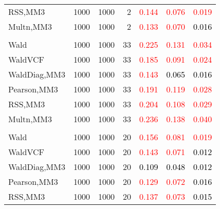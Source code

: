 \documentclass[
]{article}
\begin{document}
\begin{table}[H]
{\begin{tabular}[t]{lrrrrrr}
\hspace{1em}RSS,MM3 & 1000 & 1000 & 2 & \textcolor{red}{0.144} & \textcolor{red}{0.076} & \textcolor{red}{0.019}\\
\hspace{1em}Multn,MM3 & 1000 & 1000 & 2 & \textcolor{red}{0.133} & \textcolor{red}{0.070} & \textcolor{black}{0.016}\\
\addlinespace[0.3em]
\multicolumn{7}{l}{\textbf{1F 15V}}\\
\hspace{1em}Wald & 1000 & 1000 & 33 & \textcolor{red}{0.225} & \textcolor{red}{0.131} & \textcolor{red}{0.034}\\
\hspace{1em}WaldVCF & 1000 & 1000 & 33 & \textcolor{red}{0.185} & \textcolor{red}{0.091} & \textcolor{red}{0.024}\\
\hspace{1em}WaldDiag,MM3 & 1000 & 1000 & 33 & \textcolor{red}{0.143} & \textcolor{black}{0.065} & \textcolor{black}{0.016}\\
\hspace{1em}Pearson,MM3 & 1000 & 1000 & 33 & \textcolor{red}{0.191} & \textcolor{red}{0.119} & \textcolor{red}{0.028}\\
\hspace{1em}RSS,MM3 & 1000 & 1000 & 33 & \textcolor{red}{0.204} & \textcolor{red}{0.108} & \textcolor{red}{0.029}\\
\hspace{1em}Multn,MM3 & 1000 & 1000 & 33 & \textcolor{red}{0.236} & \textcolor{red}{0.138} & \textcolor{red}{0.040}\\
\addlinespace[0.3em]
\multicolumn{7}{l}{\textbf{2F 10V}}\\
\hspace{1em}Wald & 1000 & 1000 & 20 & \textcolor{red}{0.156} & \textcolor{red}{0.081} & \textcolor{red}{0.019}\\
\hspace{1em}WaldVCF & 1000 & 1000 & 20 & \textcolor{red}{0.143} & \textcolor{red}{0.071} & \textcolor{black}{0.012}\\
\hspace{1em}WaldDiag,MM3 & 1000 & 1000 & 20 & \textcolor{black}{0.109} & \textcolor{black}{0.048} & \textcolor{black}{0.012}\\
\hspace{1em}Pearson,MM3 & 1000 & 1000 & 20 & \textcolor{red}{0.129} & \textcolor{red}{0.072} & \textcolor{black}{0.016}\\
\hspace{1em}RSS,MM3 & 1000 & 1000 & 20 & \textcolor{red}{0.137} & \textcolor{red}{0.073} & \textcolor{black}{0.015}\\

\end{tabular}}
\end{table}
\end{document}
